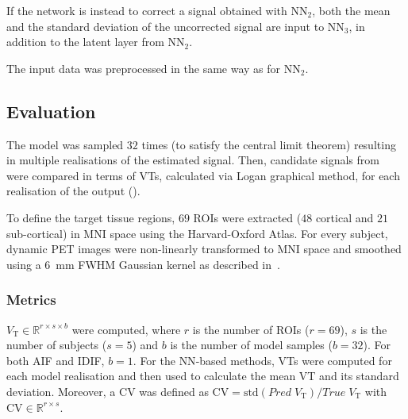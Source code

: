             If the network is instead to correct a signal obtained with \gls{NN}$_2$, both the mean and the standard deviation of the uncorrected signal are input to \gls{NN}$_3$, in addition to the latent layer from \gls{NN}$_2$. %

            The input data was preprocessed in the same way as for \gls{NN}$_2$.


    \vspace{-0.5cm}
    
    \subsection{Evaluation}\label{sec:evaluation}
        The model was sampled $32$ times (to satisfy the central limit theorem) resulting in multiple realisations of the estimated signal. 
        Then, candidate signals from~ were compared in terms of \glspl{VT}, calculated via Logan graphical method, for each realisation of the output ().
        
        To define the target tissue regions, $69$ \glspl{ROI} were extracted ($48$ cortical and $21$ sub-cortical) in \gls{MNI} space using the Harvard-Oxford Atlas. For every subject, dynamic \gls{PET} images were non-linearly transformed to \gls{MNI} space and smoothed using a \SI{6}{\milli\meter} \gls{FWHM} Gaussian kernel as described in~\cite{Alshelh2020In-vivoIllness}.

        \subsubsection{Metrics} \label{sec:metrics}
         $V_{\mathrm{T}} \in \mathbb{R}^{r \times s \times b}$ were computed, where $r$ is the number of \glspl{ROI} ($r = 69$), $s$ is the number of subjects ($s = 5$) and $b$ is the number of model samples ($b = 32$). For both AIF and IDIF, $b=1$. For the \gls{NN}-based methods, \glspl{VT} were computed for each model realisation and then used to calculate the mean \gls{VT} and its standard deviation.
        Moreover, a \gls{CV} was defined as $\mathrm{CV} = \mathrm{std} ( Pred \; V_{\mathrm{T}} ) / True \; V_{\mathrm{T}}$ with $\mathrm{CV} \in \mathbb{R}^{r \times s }$.

